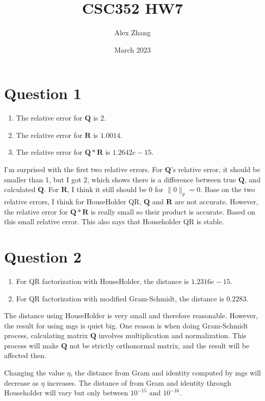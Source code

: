 \documentclass{article}
\title{CSC352 HW7}
\author{Alex Zhang}
\date{March 2023}
\newcommand{\mat}[1]{\mathbf{#1}}
\begin{document}
\maketitle

\section*{Question 1}
    \begin{enumerate}
        \item The relative error for $\mat{Q}$ is $2$.
        \item The relative error for $\mat{R}$ is $1.0014$.
        \item The relative error for $\mat{Q*R}$ is $1.2642e-15$.
    \end{enumerate}

    I'm surprised with the first two relative errors. For $\mat{Q}$'s relative error, it should be smaller than 1,
    but I got $2$, which shows there is a difference between true $\mat{Q}$, and calculated $\mat{Q}$. For $\mat{R}$, 
    I think it still should be $0$ for $\| 0\|_p = 0$. Base on the two relative errors, I think for HouseHolder QR, $\mat{Q}$ and $\mat{R}$ are not accurate.
    However, the relative error for $\mat{Q*R}$ is really small so their product is accurate. Based on this
    small relative error. This also says that Householder QR is stable.

\section*{Question 2}
    \begin{enumerate}
        \item For QR factorization with HouseHolder, the distance is $1.2316e-15$.
        \item For QR factorization with modified Gram-Schmidt, the distance is $0.2283$.
    \end{enumerate}

    The distance using HouseHolder is very small and therefore reasonable. However, the result for using mgs is quiet big.
    One reason is when doing Gram-Schmidt process, calculating matrix $\mat{Q}$ involves multiplication and normalization.
    This process will make $\mat{Q}$ not be strictly orthonormal matrix, and the result will be affected then. 

    Changing the value $\eta$, the distance from Gram and identity computed by mgs will decrease as $\eta$ increases.
    The distance of from Gram and identity through Householder will vary but only between $10^{-15}$ and $10^{-16}$.
\end{document}

